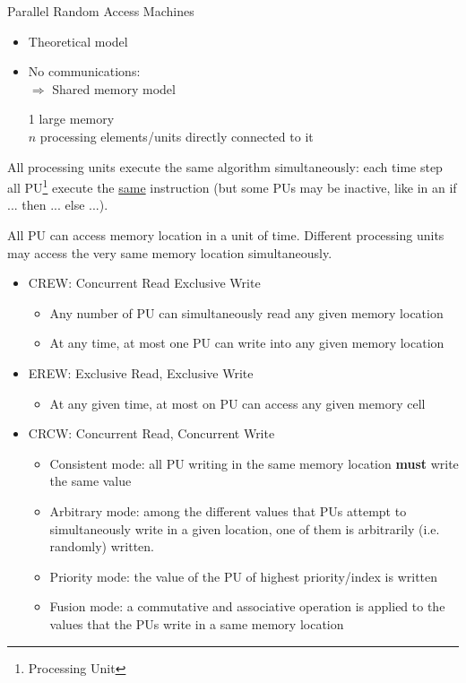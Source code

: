 Parallel Random Access Machines

\begin{itemize}
\item Theoretical model
\item No communications:\\
$\Rightarrow$ Shared memory model

1 large memory\\
$n$ processing elements/units directly connected to it
\end{itemize}

All processing units execute the same algorithm simultaneously: each time step all PU\footnote{Processing Unit} execute the \underline{same} instruction (but some PUs may be inactive, like in an if ... then ... else ...).


All PU can access memory location in a unit of time. Different processing units may access the very same memory location simultaneously. 

\begin{itemize}
\item CREW: Concurrent Read Exclusive Write
\begin{itemize}
\item  Any number of PU can simultaneously read any given memory location
\item At any time, at most one PU can write into any given memory location
\end{itemize}
\item EREW: Exclusive Read, Exclusive Write
\begin{itemize}
\item At any given time, at most on PU can access any given memory cell
\end{itemize}

\item CRCW: Concurrent Read, Concurrent Write
\begin{itemize}
\item Consistent mode: all PU writing in the same memory location \textbf{must} write the same value
\item Arbitrary mode: among the different values that PUs attempt to simultaneously write in a given location, one of them is arbitrarily (i.e. randomly) written.
\item Priority mode: the value of the PU of highest priority/index is written
\item Fusion mode: a commutative and associative operation is applied to the values that the PUs write in a same memory location
\end{itemize}
\end{itemize}


